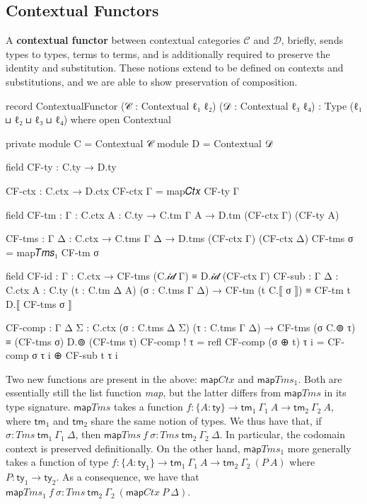 \subsection{Contextual Functors}

A \textbf{contextual functor} between contextual categories $\mathcal{C}$ and
$\mathcal{D}$, briefly, sends types to types, terms to terms, and is
additionally required to preserve the identity and substitution. These notions
extend to be defined on contexts and substitutions, and we are able to show
preservation of composition.

\begin{code}
record ContextualFunctor (𝒞 : Contextual ℓ₁ ℓ₂) (𝒟 : Contextual ℓ₃ ℓ₄)
       : Type (ℓ₁ ⊔ ℓ₂ ⊔ ℓ₃ ⊔ ℓ₄) where
  open Contextual

  private
    module C = Contextual 𝒞
    module D = Contextual 𝒟

  field
    CF-ty : C.ty → D.ty

  CF-ctx : C.ctx → D.ctx
  CF-ctx Γ = map𝐶𝑡𝑥 CF-ty Γ

  field
    CF-tm : {Γ : C.ctx} {A : C.ty} → C.tm Γ A → D.tm (CF-ctx Γ) (CF-ty A)

  CF-tms : {Γ Δ : C.ctx} → C.tms Γ Δ → D.tms (CF-ctx Γ) (CF-ctx Δ)
  CF-tms σ = map𝑇𝑚𝑠₁ CF-tm σ

  field
    CF-id : {Γ : C.ctx} → CF-tms (C.𝒾𝒹 Γ) ≡ D.𝒾𝒹 (CF-ctx Γ)
    CF-sub : {Γ Δ : C.ctx} {A : C.ty} (t : C.tm Δ A) (σ : C.tms Γ Δ) →
      CF-tm (t C.⟦ σ ⟧) ≡ CF-tm t D.⟦ CF-tms σ ⟧

  CF-comp : {Γ Δ Σ : C.ctx} (σ : C.tms Δ Σ) (τ : C.tms Γ Δ) →
    CF-tms (σ C.⊚ τ) ≡ (CF-tms σ) D.⊚ (CF-tms τ)
  CF-comp ! τ = refl
  CF-comp (σ ⊕ t) τ i = CF-comp σ τ i ⊕ CF-sub t τ i
\end{code}
\clearpage

Two new functions are present in the above: $\mathsf{map}\mathit{Ctx}$ and
$\mathsf{map}\mathit{Tms}_\mathit{1}$. Both are essentially still the list
function \emph{map}, but the latter differs from $\mathsf{map}\mathit{Tms}$ in
its type signature. $\mathsf{map}\mathit{Tms}$ takes a function $f : \{A :
\mathsf{ty}\} \to \mathsf{tm}_\mathit{1}~\Gamma_\mathit{1}~A \to
\mathsf{tm}_\mathit{2}~\Gamma_\mathit{2}~A$, where $\mathsf{tm}_\mathit{1}$ and
$\mathsf{tm}_\mathit{2}$ share the same notion of types. We thus have that, if
$\sigma : \mathit{Tms}~\mathsf{tm}_\mathit{1}~\Gamma_\mathit{1}~\Delta$, then
$\mathsf{map}\mathit{Tms}~f~\sigma : \mathit{Tms}~\mathsf{tm}_\mathit{2}
~\Gamma_\mathit{2}~\Delta$. In particular, the codomain context is preserved
definitionally. On the other hand, $\mathsf{map}\mathit{Tms}_\mathit{1}$ more
generally takes a function of type $f : \{A : \mathsf{ty}_\mathit{1}\} \to
\mathsf{tm}_\mathit{1}~\Gamma_\mathit{1}~A \to \mathsf{tm}_\mathit{2}~\Gamma
_\mathit{2}~(P~A)$ where $P : \mathsf{ty}_\mathit{1} \to \mathsf{ty}
_\mathit{2}$. As a consequence, we have that $\mathsf{map}\mathit{Tms}
_\mathit{1}~f~\sigma : \mathit{Tms}~\mathsf{tm}_\mathit{2}~\Gamma_\mathit{2}
~(\mathsf{map}\mathit{Ctx}~P~\Delta)$.

